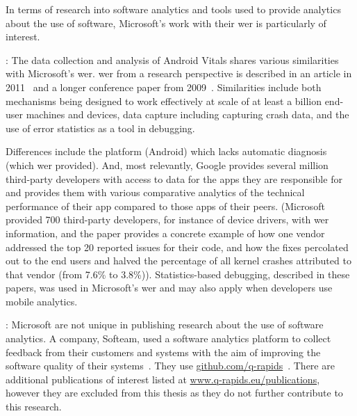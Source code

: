 In terms of research into software analytics and tools used to provide analytics about the use of software, Microsoft's work with their \Gls{wer} is particularly of interest. 

: 
The data collection and analysis of Android Vitals shares various similarities with Microsoft's \acrfull{wer}. \Gls{wer} from a research perspective is described in an article in 2011~ and a longer conference paper from 2009~. Similarities include both mechanisms being designed to work effectively at scale of at least a billion end-user machines and devices, data capture including capturing crash data, and the use of error statistics as a tool in debugging.

Differences include the platform (Android) which lacks automatic diagnosis (which \Gls{wer} provided). And, most relevantly, Google provides several million third-party developers with access to data for the apps they are responsible for and provides them with various comparative analytics of the technical performance of their app compared to those apps of their peers. (Microsoft provided 700 third-party developers, for instance of device drivers, with \Gls{wer} information, and the paper provides a concrete example of how one vendor addressed the top 20 reported issues for their code, and how the fixes percolated out to the end users and halved the percentage of all kernel crashes attributed to that vendor (from 7.6\% to 3.8\%)). Statistics-based debugging, described in these papers, was used in Microsoft's \Gls{wer} and may also apply when developers use mobile analytics.

: 
Microsoft are not unique in publishing research about the use of software analytics. A company, Softeam, used a software analytics platform to collect feedback from their customers and systems with the aim of improving the software quality of their systems~. They use \href{https://github.com/q-rapids}{github.com/q-rapids}~. There are additional publications of interest listed at \href{https://www.q-rapids.eu/publications}{www.q-rapids.eu/publications}, however they are excluded from this thesis as they do not further contribute to this research.


